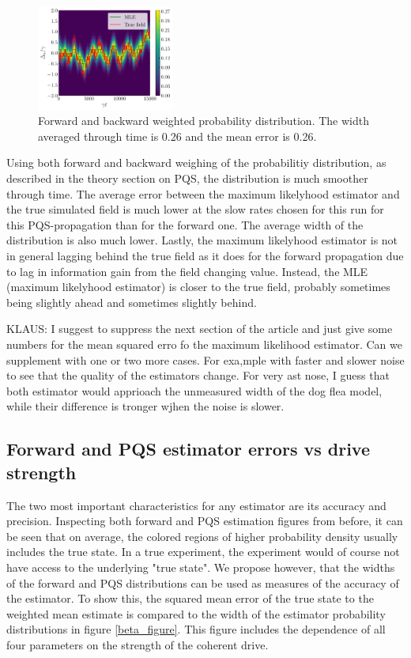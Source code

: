\documentclass[aps,pra,twocolumn,groupedaddress,showpacs]{revtex4}
\begin{document}
\begin{figure}
    \centering
    \includegraphics[width=0.4\textwidth]{PQS.pdf}
    \caption{Forward and backward weighted probability distribution. The width averaged through time is 0.26 and the mean error is 0.26.}
\end{figure}
Using both forward and backward weighing of the probabilitiy distribution, as described in the theory section on PQS, the distribution is much smoother through time. The average error between the maximum likelyhood estimator and the true simulated field is much lower at the slow rates chosen for this run for this PQS-propagation than for the forward one. The average width of the distribution is also much lower. Lastly, the maximum likelyhood estimator is not in general lagging behind the true field as it does for the forward propagation due to lag in information gain from the field changing value. Instead, the MLE (maximum likelyhood estimator) is closer to the true field, probably sometimes being slightly ahead and sometimes slightly behind.

KLAUS: I suggest to suppress the next section of the article and just give some numbers for the mean squared erro fo the maximum likelihood estimator. Can we supplement with one or two more cases. For exa,mple with faster and slower noise to see that the quality of the estimators change. For very ast nose, I guess that both estimator would apprioach the unmeasured width of the dog flea model, while their difference is tronger wjhen the noise is slower.


\subsection{Forward and PQS estimator errors vs drive strength}
The two most important characteristics for any estimator are its accuracy and precision. Inspecting both forward and PQS estimation figures from before, it can be seen that on average, the colored regions of higher probability density usually includes the true state. In a true experiment, the experiment would of course not have access to the underlying "true state". We propose however, that the widths of the forward and PQS distributions can be used as measures of the accuracy of the estimator. To show this, the squared mean error of the true state to the weighted mean estimate is compared to the width of the estimator probability distributions in figure \ref{beta_figure}. This figure includes the dependence of all four parameters on the strength of the coherent drive.
\end{document}
